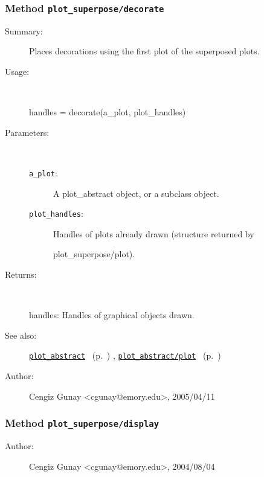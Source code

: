 \subsubsection[Method \texttt{decorate}]{Method \texttt{plot\_superpose/decorate}}%
%
\label{ref_plot_superpose__decorate}%
\hypertarget{ref_plot_superpose__decorate}{}%
\begin{description}
\item[Summary:]Places decorations using the first plot of the superposed plots.
%
\item[Usage:]~%
\begin{lyxcode}%
handles = decorate(a\_plot, plot\_handles)
%
\end{lyxcode}%
%
%
\item[Parameters:]~
\begin{description}%
\item[\texttt{a\_plot}:]
 A plot\_abstract object, or a subclass object.
\item[\texttt{plot\_handles}:]
 Handles of plots already drawn (structure returned by

plot\_superpose/plot). 
\end{description}%
%
\item[Returns:
]~

   handles: Handles of graphical objects drawn.
%
%
\item[See also:]%
\hyperlink{ref_plot_abstract}{\texttt{plot\_abstract}}%
\ (p.~\pageref{ref_plot_abstract})%
%
, \hyperlink{ref_plot_abstract__plot}{\texttt{plot\_abstract/plot}}%
\ (p.~\pageref{ref_plot_abstract__plot})%
%
%
\item[Author:]%
Cengiz Gunay <cgunay@emory.edu>, 2005/04/11
%
\end{description}
\methodline%
\subsubsection[Method \texttt{display}]{Method \texttt{plot\_superpose/display}}%
%
\label{ref_plot_superpose__display}%
\hypertarget{ref_plot_superpose__display}{}%
\begin{description}
%
%
%
%
%
%
%
\item[Author:]%
Cengiz Gunay <cgunay@emory.edu>, 2004/08/04
%
\end{description}
\methodline%
